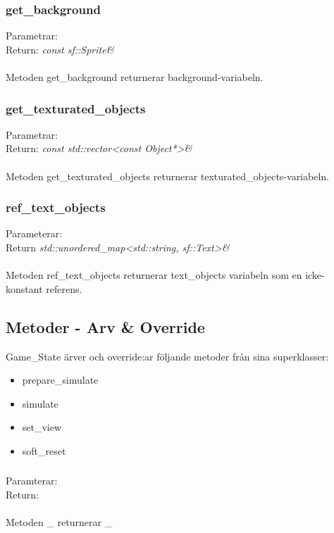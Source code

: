 \documentclass{TDP003mall}
\begin{document}
\subsubsection{get\_background}
Parametrar: \textit{}
\\Return: \textit{const sf::Sprite\&}
\\\\
Metoden get\_background returnerar background-variabeln.

\subsubsection{get\_texturated\_objects}
Parametrar: \textit{}
\\Return: \textit{const std::vector<const Object*>\&}
\\\\
Metoden get\_texturated\_objects returnerar texturated\_objects-variabeln.

\subsubsection{ref\_text\_objects}
Parameterar: \textit{}
\\Return \textit{std::unordered\_map<std::string, sf::Text>&}
\\\\
Metoden ref\_text\_objects returnerar text\_objects variabeln som en icke-konstant referens.

\subsection{Metoder - Arv \& Override}
Game\_State ärver och override:ar följande metoder från sina superklasser:
\begin{itemize}
\item prepare\_simulate
\item simulate
\item set\_view
\item soft\_reset
\end{itemize}

\subsubsection{}
Paramterar: \textit{}
\\Return: \textit{}
\\\\
Metoden \_ returnerar \_
\end{document}
